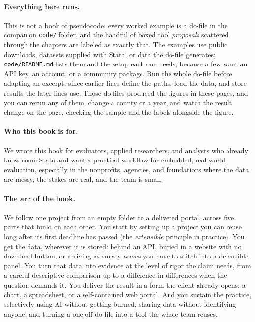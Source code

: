 \paragraph{Everything here runs.} This is not a book of pseudocode: every worked example is a do-file in the companion \texttt{code/} folder, and the handful of boxed tool \emph{proposals} scattered through the chapters are labeled as exactly that. The examples use public downloads, datasets supplied with Stata, or data the do-file generates; \texttt{code/README.md} lists them and the setup each one needs, because a few want an API key, an account, or a community package. Run the whole do-file before adapting an excerpt, since earlier lines define the paths, load the data, and store results the later lines use. Those do-files produced the figures in these pages, and you can rerun any of them, change a county or a year, and watch the result change on the page, checking the sample and the labels alongside the figure.

\paragraph{Who this book is for.} We wrote this book for evaluators, applied researchers, and analysts who already know some Stata and want a practical workflow for embedded, real-world evaluation, especially in the nonprofits, agencies, and foundations where the data are messy, the stakes are real, and the team is small.

\paragraph{The arc of the book.} We follow one project from an empty folder to a delivered portal, across five parts that build on each other. You start by setting up a project you can reuse long after its first deadline has passed (the \emph{extensible} principle in practice). You get the data, wherever it is stored: behind an API, buried in a website with no download button, or arriving as survey waves you have to stitch into a defensible panel. You turn that data into evidence at the level of rigor the claim needs, from a careful descriptive comparison up to a difference-in-differences when the question demands it. You deliver the result in a form the client already opens: a chart, a spreadsheet, or a self-contained web portal. And you sustain the practice, selectively using AI without getting burned, sharing data without identifying anyone, and turning a one-off do-file into a tool the whole team reuses.


